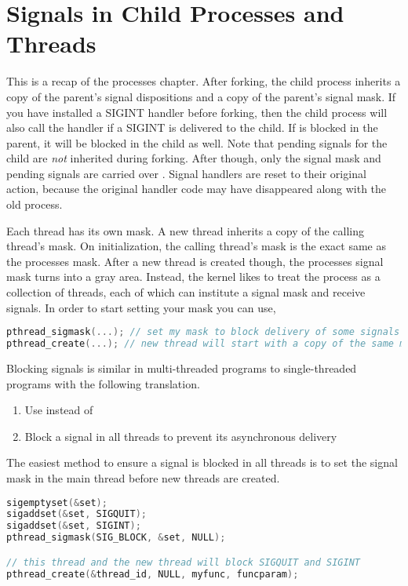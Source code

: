 \section{Signals in Child Processes and Threads}

This is a recap of the processes chapter.
After forking, the child process inherits a copy of the parent's signal dispositions and a copy of the parent's signal mask.
If you have installed a SIGINT handler before forking, then the child process will also call the handler if a SIGINT is delivered to the child.
If  is blocked in the parent, it will be blocked in the child as well.
Note that pending signals for the child are \emph{not} inherited during forking.
After  though, only the signal mask and pending signals are carried over \cite{execute}.
Signal handlers are reset to their original action, because the original handler code may have disappeared along with the old process.

Each thread has its own mask.
A new thread inherits a copy of the calling thread's mask.
On initialization, the calling thread's mask is the exact same as the processes mask.
After a new thread is created though, the processes signal mask turns into a gray area.
Instead, the kernel likes to treat the process as a collection of threads, each of which can institute a signal mask and receive signals.
In order to start setting your mask you can use,

\begin{lstlisting}[language=C]
pthread_sigmask(...); // set my mask to block delivery of some signals
pthread_create(...); // new thread will start with a copy of the same mask
\end{lstlisting}

Blocking signals is similar in multi-threaded programs to single-threaded programs with the following translation.

\begin{enumerate}
\item Use  instead of 
\item Block a signal in all threads to prevent its asynchronous delivery
\end{enumerate}

The easiest method to ensure a signal is blocked in all threads is to set the signal mask in the main thread before new threads are created.

\begin{lstlisting}[language=C]
sigemptyset(&set);
sigaddset(&set, SIGQUIT);
sigaddset(&set, SIGINT);
pthread_sigmask(SIG_BLOCK, &set, NULL);

// this thread and the new thread will block SIGQUIT and SIGINT
pthread_create(&thread_id, NULL, myfunc, funcparam);
\end{lstlisting}

